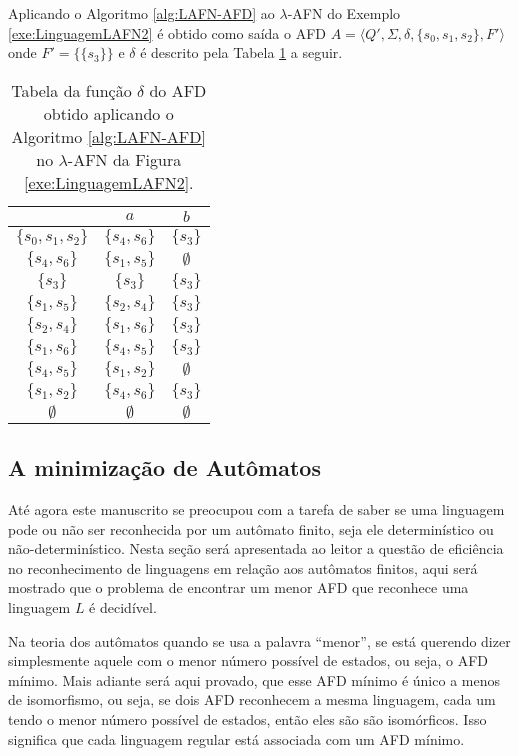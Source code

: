 \begin{exem}
	Aplicando o Algoritmo \ref{alg:LAFN-AFD} ao $\lambda$-AFN do Exemplo \ref{exe:LinguagemLAFN2} é obtido como saída o AFD $A = \langle Q', \Sigma, \delta, \{s_0, s_1, s_2\}, F' \rangle$ onde $F' = \{\{s_3\}\}$ e $\delta$ é descrito pela Tabela \ref{tab:DeltaAFD} a seguir. 
	
	\begin{table}[h]
		\centering
		\begin{tabular}{c|cc}
			\backslashbox{$Q'$}{$\Sigma$}	& $a$ & $b$\\ \hline
			$\{s_0, s_1, s_2\}$  & $\{s_4, s_6\}$ & $\{s_3\}$\\
			$\{s_4, s_6\}$  & $\{s_1, s_5\}$ & $\emptyset$\\
			$\{s_3\}$ & $\{s_3\}$ & $\{s_3\}$\\
			$\{s_1, s_5\}$ & $\{s_2, s_4\}$ & $\{s_3\}$\\
			$\{s_2, s_4\}$ & $\{s_1, s_6\}$ & $\{s_3\}$\\
			$\{s_1, s_6\}$ & $\{s_4, s_5\}$ & $\{s_3\}$\\
			$\{s_4, s_5\}$ & $\{s_1, s_2\}$ & $\emptyset$\\
			$\{s_1, s_2\}$ & $\{s_4, s_6\}$ & $\{s_3\}$\\ 
			$\emptyset$ & $\emptyset$ & $\emptyset$
		\end{tabular}
		\caption{Tabela da função $\delta$ do AFD obtido aplicando o  Algoritmo \ref{alg:LAFN-AFD} no $\lambda$-AFN da Figura \ref{exe:LinguagemLAFN2}.}
		\label{tab:DeltaAFD}
	\end{table}
\end{exem}

\subsection{A minimização de Autômatos}

Até agora este manuscrito se preocupou com a tarefa de saber se uma linguagem pode ou não ser reconhecida por um autômato finito,  seja ele determinístico ou não-determinístico. Nesta seção será apresentada ao leitor a questão de eficiência no reconhecimento de linguagens em relação aos autômatos finitos, aqui será mostrado que o problema de encontrar um menor AFD que reconhece uma linguagem $L$ é decidível. 

Na teoria dos autômatos quando se usa a palavra ``menor'', se está querendo dizer simplesmente aquele com o menor número possível de estados, ou seja, o AFD mínimo.  Mais adiante será aqui provado, que esse AFD mínimo é único a menos de isomorfismo, ou seja, se dois AFD reconhecem a mesma linguagem, cada um tendo o menor número possível de estados, então eles são são isomórficos. Isso significa que cada linguagem regular está associada com um AFD mínimo. 

